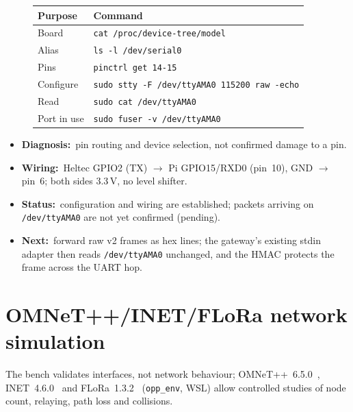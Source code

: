 \documentclass[10pt,a4paper]{article}
\newcommand{\pend}{\textcolor{hwc}{pending}}
\newcommand{\lead}[1]{\textbf{#1}\,}
\begin{document}
\begin{figure}[!htb]
\begin{minipage}[c]{0.5\textwidth}
\centering
\resizebox{\linewidth}{!}{}
\label{fig:uart}
\end{minipage}\hfill
\begin{minipage}[c]{0.47\textwidth}
\centering\footnotesize
{}
\label{tab:uartcmd}
\begin{tabularx}{\linewidth}{@{}L{1.75cm}Y@{}}
\toprule
Purpose & Command\\
\midrule
Board & \texttt{cat /proc/device-tree/model}\\
Alias & \texttt{ls -l /dev/serial0}\\
Pins & \texttt{pinctrl get 14-15}\\
Configure & \texttt{sudo stty -F /dev/ttyAMA0 115200 raw -echo}\\
Read & \texttt{sudo cat /dev/ttyAMA0}\\
Port in use & \texttt{sudo fuser -v /dev/ttyAMA0}\\
\bottomrule
\end{tabularx}
\end{minipage}
\end{figure}
\begin{itemize}
\item \lead{Diagnosis:} pin routing and device selection, not confirmed damage to a pin.
\item \lead{Wiring:} Heltec GPIO2 (TX) $\to$ Pi GPIO15/RXD0 (pin~10), GND $\to$ pin~6; both sides 3.3\,V, no level shifter.
\item \lead{Status:} configuration and wiring are established; packets arriving on \texttt{/dev/ttyAMA0} are not yet confirmed (\pend).
\item \lead{Next:} forward raw v2 frames as hex lines; the gateway's existing stdin adapter then reads \texttt{/dev/ttyAMA0} unchanged, and the HMAC protects the frame across the UART hop.
\end{itemize}

\section{OMNeT++/INET/FLoRa network simulation}\label{sec:sim}
The bench validates interfaces, not network behaviour; OMNeT++~6.5.0~\cite{varga2008omnet}, INET~4.6.0~\cite{inet} and FLoRa~1.3.2~\cite{slabicki2018flora} (\texttt{opp\_env}, WSL) allow controlled studies of node count, relaying, path loss and collisions.
\end{document}
